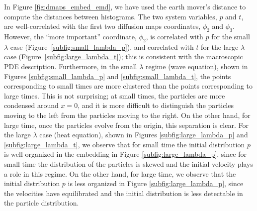 \documentclass[prl, reprint, final, showkeys]{revtex4-1}
\begin{document}
In Figure \ref{fig:dmaps_embed_emd}, we have used the earth mover's distance to compute the distances between histograms.
%
The two system variables, $p$ and $t$, are well-correlated with the first two diffusion maps coordinates, $\phi_2$ and $\phi_3$. 
%
However, the ``more important'' coordinate, $\phi_2$, is correlated with $p$ for the small $\lambda$ case (Figure~\ref{subfig:small_lambda_p}), and correlated with $t$ for the large $\lambda$ case (Figure~\ref{subfig:large_lambda_t}); 
this is consistent with the macroscopic PDE description.
%
Furthermore, in the small $\lambda$ regime (wave equation), shown in Figures \ref{subfig:small_lambda_p} and \ref{subfig:small_lambda_t}, the points corresponding to small times are more clustered than the points corresponding to large times.
%
This is not surprising; at small times, the particles are more condensed around $x=0$, and it is more difficult to distinguish the particles moving to the left from the particles moving to the right. 
%
On the other hand, for large time, once the particles evolve from the origin, this separation is clear.  
%
For the large $\lambda$ case (heat equation), shown in Figures \ref{subfig:large_lambda_p} and \ref{subfig:large_lambda_t}, we observe that for small time the initial distribution $p$ is well organized in the embedding in Figure \ref{subfig:large_lambda_p}, since for small time the distribution of the particles is skewed and the initial velocity plays a role in this regime. 
%
On the other hand, for large time, we observe that the initial distribution $p$ is less organized in Figure \ref{subfig:large_lambda_p}, since the velocities have equilibrated and the initial distribution is less detectable in the particle distribution.
\end{document}
